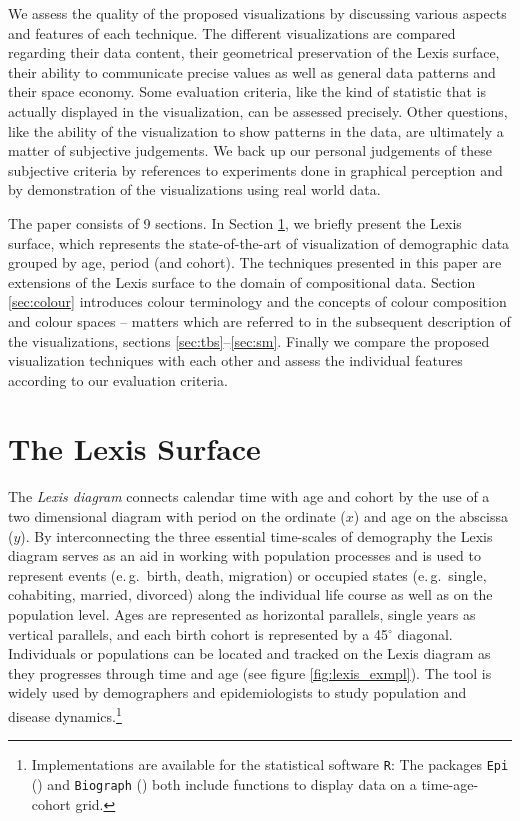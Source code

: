 \documentclass[a4paper, 12pt]{scrartcl}
\begin{document}
We assess the quality of the proposed visualizations by discussing various aspects and features of each technique. The different visualizations are compared regarding their data content, their geometrical preservation of the Lexis surface, their ability to communicate precise values as well as general data patterns and their space economy. Some evaluation criteria, like the kind of statistic that is actually displayed in the visualization, can be assessed precisely. Other questions, like the ability of the visualization to show patterns in the data, are ultimately a matter of subjective judgements. We back up our personal judgements of these subjective criteria by references to experiments done in graphical perception and by demonstration of the visualizations using real world data.

The paper consists of 9 sections. In Section \ref{sec:lexis}, we briefly present the Lexis surface, which represents the state-of-the-art of visualization of demographic data grouped by age, period (and cohort). The techniques presented in this paper are extensions of the Lexis surface to the domain of compositional data. Section \ref{sec:colour} introduces colour terminology and the concepts of colour composition and colour spaces -- matters which are referred to in the subsequent description of the visualizations, sections \ref{sec:tbs}--\ref{sec:sm}. Finally we compare the proposed visualization techniques with each other and assess the individual features according to our evaluation criteria.

\section{The Lexis Surface} %
\label{sec:lexis}

The \emph{Lexis diagram} connects calendar time with age and cohort by the use of a two dimensional diagram with period on the ordinate ($x$) and age on the abscissa ($y$). By interconnecting the three essential time-scales of demography the Lexis diagram serves as an aid in working with population processes and is used to represent events (e.\,g.~birth, death, migration) or occupied states (e.\,g.~single, cohabiting, married, divorced) along the individual life course as well as on the population level. Ages are represented as horizontal parallels, single years as vertical parallels, and each birth cohort is represented by a 45$^\circ$ diagonal. Individuals or populations can be located and tracked on the Lexis diagram as they progresses through time and age (see figure \ref{fig:lexis_exmpl}). The tool is widely used by demographers and epidemiologists to study population and disease dynamics.\footnote{Implementations are available for the statistical software \texttt{R}: The packages \texttt{Epi} (\cite{Carstensen2014}) and \texttt{Biograph} (\cite{Willekens2013b}) both include functions to display data on a time-age-cohort grid.}
\end{document}

